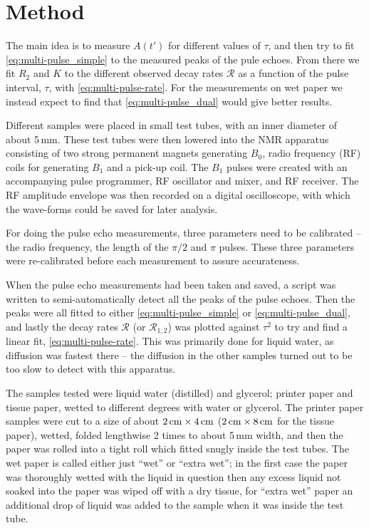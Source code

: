 \documentclass[11pt,a4paper, twocolumn,
swedish, english %
]{article}
\begin{document}
\section{Method} \label{sec:met}
The main idea is to measure $A(t')$ for different values of $\tau$,
and then try to fit \eqref{eq:multi-pulse_simple} to the measured
peaks of the pule echoes. From there we fit $R_2$ and $K$ to the
different observed decay rates $\mathcal{R}$ as a function of the
pulse interval, $\tau$, with \eqref{eq:multi-pulse-rate}. For the
measurements on wet paper we instead expect to find that
\eqref{eq:multi-pulse_dual} would give better results.

Different samples were placed in small test tubes, with an inner
diameter of about 5\,mm. These test tubes were then lowered into the
NMR apparatus consisting of two strong permanent magnets generating
$B_0$, radio frequency (RF) coils for generating $B_1$ and a pick-up
coil. The $B_1$ pulses were created with an accompanying pulse
programmer, RF oscillator and mixer, and RF receiver. The RF amplitude
envelope was then recorded on a digital oscilloscope, with which the
wave-forms could be saved for later analysis. 

For doing the pulse echo measurements, three parameters need to be
calibrated -- the radio frequency, the length of the $\pi/2$ and $\pi$
pulses. These three parameters were re-calibrated before each
measurement to assure accurateness.

When the pulse echo measurements had been taken and saved, a script
was written to semi-automatically\footnotemark{} detect all the peaks
of the pulse echoes. Then the peaks were all fitted to either
\eqref{eq:multi-pulse_simple} or \eqref{eq:multi-pulse_dual}, and
lastly the decay rates $\mathcal{R}$ (or $\mathcal{R}_{1, 2}$) was
plotted against $\tau^2$ to try and find a linear fit,
\eqref{eq:multi-pulse-rate}. This was primarily done for liquid water,
as diffusion was fastest there -- the diffusion in the other samples
turned out to be too slow to detect with this apparatus.


The samples tested were liquid water (distilled) and glycerol; 
printer paper and tissue paper, wetted to different degrees with water
or glycerol. The printer paper samples were cut to a size of about
$\unit[2]{cm}\times\unit[4]{cm}$ ($\unit[2]{cm}\times\unit[8]{cm}$ for
the tissue paper), wetted, folded lengthwise 2 times to about 5\,mm
width, and then the paper was rolled into a tight roll which fitted
snugly inside the test tubes.
The wet paper is called either just ``wet'' or ``extra
wet''; in the first case the paper was thoroughly wetted with the
liquid in question then any excess liquid not soaked into the paper was
wiped off with a dry tissue, for ``extra wet'' paper an additional
drop of liquid was added to the sample when it was inside the test
tube. 
\end{document}
